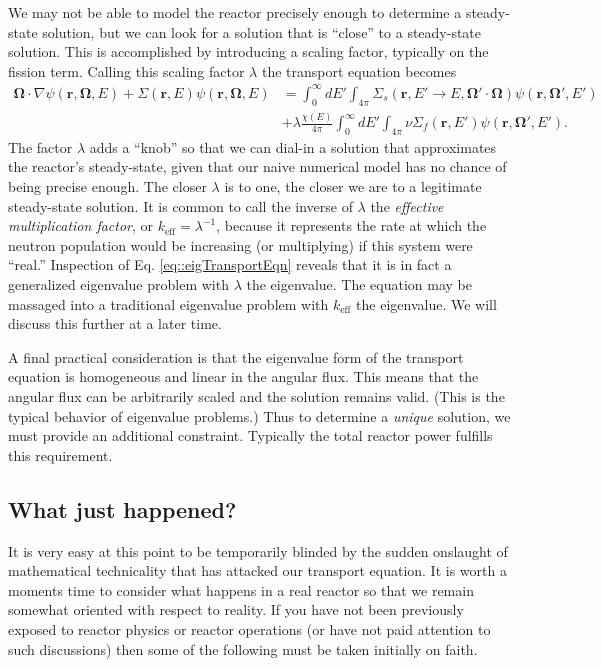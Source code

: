 \documentclass[11pt]{article}
\renewcommand\vec{\mathbf}
\begin{document}
We may not be able to model the reactor precisely enough to determine a steady-state solution, but we can look for a solution that is ``close'' to a steady-state solution.  This is accomplished by introducing a scaling factor, typically on the fission term.  Calling this scaling factor \(\lambda\) the transport equation becomes
\begin{align}
  \vec{\Omega} \cdot \nabla\psi(\vec{r},\vec{\Omega},E)
  + \Sigma(\vec{r},E) \psi(\vec{r},\vec{\Omega},E)
  &= \int_0^\infty dE' \int_{4\pi} \Sigma_s(\vec{r},E' \rightarrow E, \vec{\Omega}'\cdot\vec{\Omega}) \psi(\vec{r},\vec{\Omega}',E') \\
  &+ \lambda\frac{\chi(E)}{4\pi} \int_0^\infty dE' \int_{4\pi} \nu\Sigma_f(\vec{r},E') \psi(\vec{r},\vec{\Omega}',E').
  \label{eq::eigTransportEqn}
\end{align}
The factor \(\lambda\) adds a ``knob'' so that we can dial-in a solution that approximates the reactor's steady-state, given that our naive numerical model has no chance of being precise enough.  The closer \(\lambda\) is to one, the closer we are to a legitimate steady-state solution.  It is common to call the inverse of \(\lambda\) the \emph{effective multiplication factor}, or \(k_\text{eff} = \lambda^{-1}\), because it represents the rate at which the neutron population would be increasing (or multiplying) if this system were ``real.''  Inspection of Eq. \eqref{eq::eigTransportEqn} reveals that it is in fact a generalized eigenvalue problem with \(\lambda\) the eigenvalue.  The equation may be massaged into a traditional eigenvalue problem with \(k_\text{eff}\) the eigenvalue.  We will discuss this further at a later time.

A final practical consideration is that the eigenvalue form of the transport equation is homogeneous and linear in the angular flux.  This means that the angular flux can be arbitrarily scaled and the solution remains valid.  (This is the typical behavior of eigenvalue problems.)  Thus to determine a \emph{unique} solution, we must provide an additional constraint.  Typically the total reactor power fulfills this requirement.

\subsection{What just happened?}
\label{sec:orgheadline8}
It is very easy at this point to be temporarily blinded by the sudden onslaught of mathematical technicality that has attacked our transport equation.  It is worth a moments time to consider what happens in a real reactor so that we remain somewhat oriented with respect to reality.  If you have not been previously exposed to reactor physics or reactor operations (or have not paid attention to such discussions) then some of the following must be taken initially on faith.
\end{document}
